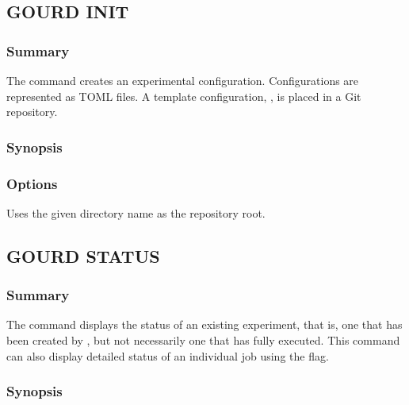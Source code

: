 \documentclass[a4paper,english]{article}
\begin{document}
    \subsection{GOURD INIT}

        \subsubsection{Summary}
        The   command creates an experimental configuration.
        Configurations are represented as TOML files.
        A template configuration, , is placed in a Git repository.

        \subsubsection{Synopsis}
              

        \subsubsection{Options}
        \begin{Description}[Options]\setlength{\itemsep}{0cm}
        \item[\OptArg{-D}{ directory}]
        Uses the given directory name as the repository root.
        \end{Description}

    \subsection{GOURD STATUS}

    \subsubsection{Summary}
    The   command displays the status of an existing experiment,
    that is, one that has been created by  , but not necessarily
    one that has fully executed.
    This command can also display detailed status of an individual job using the  flag.

    \subsubsection{Synopsis}
           
\end{document}
